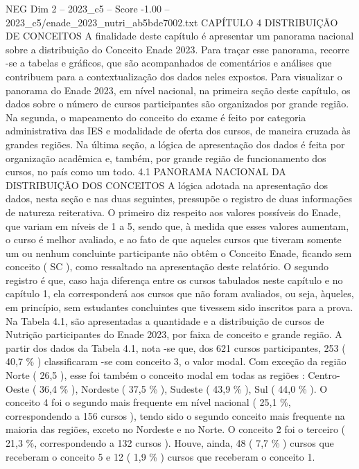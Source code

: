 \begin{textsample}{NEG Dim 2 – 2023\_c5 – Score -1.00 – 2023\_c5/enade\_2023\_nutri\_ab5bde7002.txt}  \label{ex:f2_neg_180}
CAPÍTULO 4 DISTRIBUIÇÃO DE CONCEITOS A finalidade deste capítulo é apresentar um panorama nacional sobre a distribuição do Conceito Enade 2023.
Para traçar esse panorama, recorre -se a tabelas e gráficos, que são acompanhados de comentários e análises que contribuem para a contextualização dos dados neles expostos.
Para visualizar o panorama do Enade 2023, em nível nacional, na primeira seção deste capítulo, os dados sobre o número de cursos participantes são organizados por grande região.
Na segunda, o mapeamento do conceito do exame é feito por categoria administrativa das IES e modalidade de oferta dos cursos, de maneira cruzada às grandes regiões.
Na última seção, a lógica de apresentação dos dados é feita por organização acadêmica e, também, por grande região de funcionamento dos cursos, no país como um todo. 4.1 PANORAMA NACIONAL DA DISTRIBUIÇÃO DOS CONCEITOS A lógica adotada na apresentação dos dados, nesta seção e nas duas seguintes, pressupõe o registro de duas informações de natureza reiterativa.
O primeiro diz respeito aos valores possíveis do Enade, que variam em níveis de 1 a 5, sendo que, à medida que esses valores aumentam, o curso é melhor avaliado, e ao fato de que aqueles cursos que tiveram somente um ou nenhum concluinte participante não obtêm o Conceito Enade, ficando sem conceito ( SC ), como ressaltado na apresentação deste relatório.
O segundo registro é que, caso haja diferença entre os cursos tabulados neste capítulo e no capítulo 1, ela corresponderá aos cursos que não foram avaliados, ou seja, àqueles, em princípio, sem estudantes concluintes que tivessem sido inscritos para a prova.
Na Tabela 4.1, são apresentadas a quantidade e a distribuição de cursos de Nutrição participantes do Enade 2023, por faixa de conceito e grande região.
A partir dos dados da Tabela 4.1, nota -se que, dos 621 cursos participantes, 253 ( 40,7 \% ) classificaram -se com conceito 3, o valor modal.
Com exceção da região Norte ( 26,5 ), esse foi também o conceito modal em todas as regiões : Centro-Oeste ( 36,4 \% ), Nordeste ( 37,5 \% ), Sudeste ( 43,9 \% ), Sul ( 44,0 \% ).
O conceito 4 foi o segundo mais frequente em nível nacional ( 25,1 \%, correspondendo a 156 cursos ), tendo sido o segundo conceito mais frequente na maioria das regiões, exceto no Nordeste e no Norte.
O conceito 2 foi o terceiro ( 21,3 \%, correspondendo a 132 cursos ).
Houve, ainda, 48 ( 7,7 \% ) cursos que receberam o conceito 5 e 12 ( 1,9 \% ) cursos que receberam o conceito 1.

\end{textsample}
